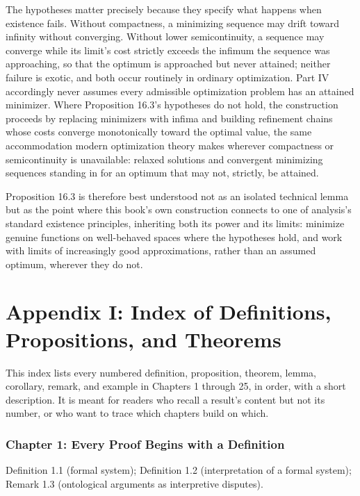 \documentclass[11pt]{book}
\begin{document}
The hypotheses matter precisely because they specify what happens when existence fails. Without compactness, a minimizing sequence may drift toward infinity without converging. Without lower semicontinuity, a sequence may converge while its limit's cost strictly exceeds the infimum the sequence was approaching, so that the optimum is approached but never attained; neither failure is exotic, and both occur routinely in ordinary optimization. Part IV accordingly never assumes every admissible optimization problem has an attained minimizer. Where Proposition 16.3's hypotheses do not hold, the construction proceeds by replacing minimizers with infima and building refinement chains whose costs converge monotonically toward the optimal value, the same accommodation modern optimization theory makes wherever compactness or semicontinuity is unavailable: relaxed solutions and convergent minimizing sequences standing in for an optimum that may not, strictly, be attained.

Proposition 16.3 is therefore best understood not as an isolated technical lemma but as the point where this book's own construction connects to one of analysis's standard existence principles, inheriting both its power and its limits: minimize genuine functions on well-behaved spaces where the hypotheses hold, and work with limits of increasingly good approximations, rather than an assumed optimum, wherever they do not.

\chapter*{Appendix I: Index of Definitions, Propositions, and Theorems}

This index lists every numbered definition, proposition, theorem, lemma, corollary, remark, and example in Chapters 1 through 25, in order, with a short description. It is meant for readers who recall a result's content but not its number, or who want to trace which chapters build on which.

\subsection*{Chapter 1: Every Proof Begins with a Definition}
Definition 1.1 (formal system); Definition 1.2 (interpretation of a formal system); Remark 1.3 (ontological arguments as interpretive disputes).
\end{document}
